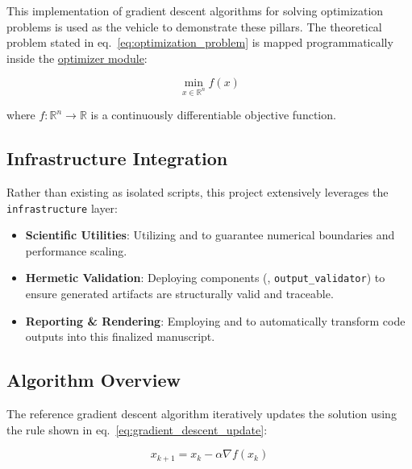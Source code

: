 \documentclass[
]{article}
\providecommand{\tightlist}{%
  \setlength{\itemsep}{0pt}\setlength{\parskip}{0pt}}
\begin{document}
This implementation of gradient descent algorithms for solving
optimization problems is used as the vehicle to demonstrate these
pillars. The theoretical problem stated in
eq.~\ref{eq:optimization_problem} is mapped programmatically inside the
\href{https://github.com/docxology/template/blob/main/projects/template_code_project/src/optimizer.py}{optimizer
module}:

\begin{equation}
\label{eq:optimization_problem}
\min_{x \in \mathbb{R}^n} f(x)
\end{equation}

where \(f: \mathbb{R}^n \rightarrow \mathbb{R}\) is a continuously
differentiable objective function.

\subsection{Infrastructure
Integration}\label{infrastructure-integration}

Rather than existing as isolated scripts, this project extensively
leverages the \texttt{infrastructure} layer:

\begin{itemize}
\tightlist
\item
  \textbf{Scientific Utilities}: Utilizing
   and
   to guarantee numerical
  boundaries and performance scaling.
\item
  \textbf{Hermetic Validation}: Deploying
   components
  (, \texttt{output\_validator}) to ensure
  generated artifacts are structurally valid and traceable.
\item
  \textbf{Reporting \& Rendering}: Employing
   and
   to automatically
  transform code outputs into this finalized manuscript.
\end{itemize}

\subsection{Algorithm Overview}\label{algorithm-overview}

The reference gradient descent algorithm iteratively updates the
solution using the rule shown in eq.~\ref{eq:gradient_descent_update}:

\begin{equation}
\label{eq:gradient_descent_update}
x_{k+1} = x_k - \alpha \nabla f(x_k)
\end{equation}
\end{document}
